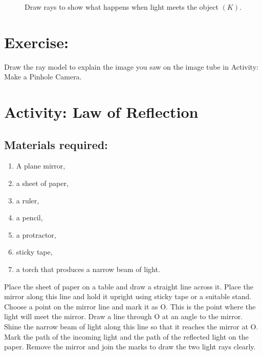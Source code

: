 \documentclass{xtufte-handout}
\begin{document}
\begin{figure}[h!]
  \caption{\label{fig:raymodel-exercise}Draw rays to show what happens when light meets the object $(K)$.}
\end{figure}

\section{Exercise:} Draw the ray model to explain the image you saw on the image tube in Activity: Make a Pinhole Camera.


\section{Activity: Law of Reflection}

\subsection{Materials required:}
\begin{enumerate}
\item A plane mirror,
\item a sheet of paper,
\item a ruler,
\item a pencil,
\item a protractor,
\item sticky tape,
\item a torch that produces a narrow beam of light.
\end{enumerate}
Place the sheet of paper on a table and draw a straight line across it. Place the mirror along this line and hold it upright using sticky tape or a suitable stand. Choose a point on the mirror line and mark it as O. This is the point where the light will meet the mirror. Draw a line through O at an angle to the mirror. Shine the narrow beam of light along this line so that it reaches the mirror at O. Mark the path of the incoming light and the path of the reflected light on the paper. Remove the mirror and join the marks to draw the two light rays clearly.
\end{document}
